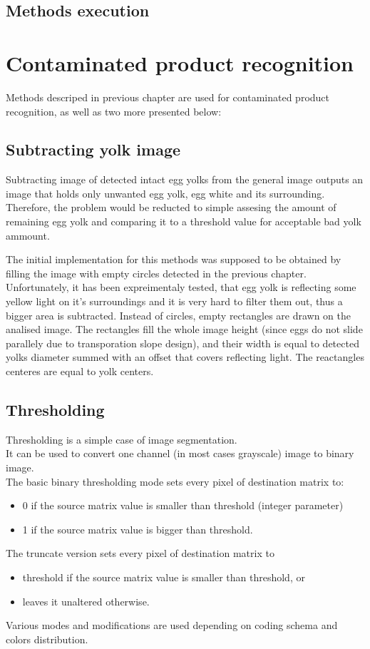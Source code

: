 \documentclass[12pt,twoside,a4paper]{article}
\begin{document}
  



\subsection{Methods execution}


\section{Contaminated product recognition}
Methods descriped in previous chapter are used for contaminated product recognition, as well as two more presented below:

\subsection{Subtracting yolk image}
Subtracting image of detected intact egg yolks from the general image outputs an image that holds only unwanted egg yolk, egg white and its surrounding.
Therefore, the problem would be reducted to simple assesing the amount of remaining egg yolk and comparing it to a threshold value for acceptable bad yolk ammount.

The initial implementation for this methods was supposed to be obtained by filling the image with empty circles detected in the previous chapter.
Unfortunately, it has been expreimentaly tested, that egg yolk is reflecting some yellow light on it's surroundings and it is very hard to filter them out, thus a bigger area is subtracted.
Instead of circles, empty rectangles are drawn on the analised image. The rectangles fill the whole image height (since eggs do not slide parallely due to transporation slope design), and their width is equal to detected yolks diameter summed with an offset that covers reflecting light. The reactangles centeres are equal to yolk centers.

\subsection{Thresholding}

Thresholding is a simple case of image segmentation.\\
It can be used to convert one channel (in most cases grayscale) image to binary image.\\
The basic binary thresholding mode sets every pixel of destination matrix to:
\begin{itemize}
\item 0 if the source matrix value is smaller than threshold (integer parameter)
\item 1 if the source matrix value is bigger than threshold.
\end{itemize}
The truncate version sets every pixel of destination matrix to
\begin{itemize}
\item threshold if the source matrix value is smaller than threshold, or
\item leaves it unaltered otherwise.
\end{itemize}
Various modes and modifications are used depending on coding schema and colors distribution.
  
\end{document}
